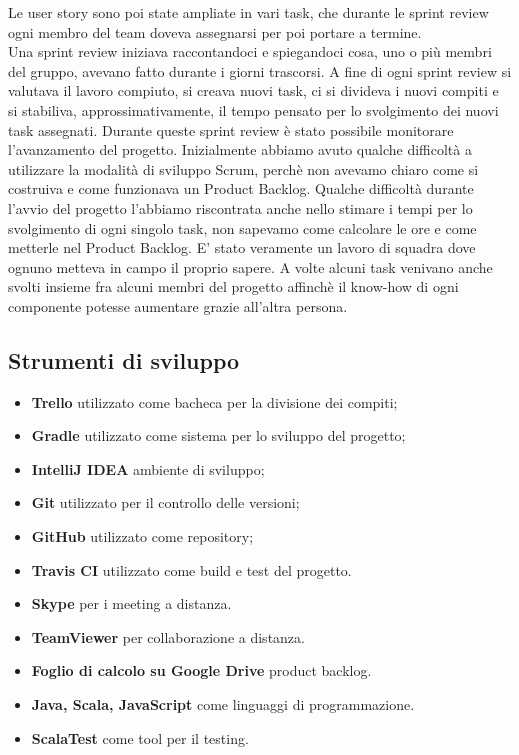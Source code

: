 \documentclass[12pt, italian]{article}
\begin{document}
Le user story sono poi state ampliate in vari task, che durante le sprint review ogni membro del team doveva assegnarsi per poi portare a termine. \\Una sprint review iniziava raccontandoci e spiegandoci cosa, uno o più membri del gruppo, avevano fatto durante i giorni trascorsi. A fine di ogni sprint review si valutava il lavoro compiuto, si creava nuovi task, ci si divideva i nuovi compiti e si stabiliva, approssimativamente, il tempo pensato per lo svolgimento dei nuovi task assegnati. Durante queste sprint review è stato possibile monitorare l'avanzamento del progetto. Inizialmente abbiamo avuto qualche difficoltà a utilizzare la modalità di sviluppo Scrum, perchè non avevamo chiaro come si costruiva e come funzionava un Product Backlog. Qualche difficoltà durante l'avvio del progetto l'abbiamo riscontrata anche nello stimare i tempi per lo svolgimento di ogni singolo task, non sapevamo come calcolare le ore e come metterle nel Product Backlog. E' stato veramente un lavoro di squadra dove ognuno metteva in campo il proprio sapere. A volte alcuni task venivano anche svolti insieme fra alcuni membri del progetto affinchè il know-how di ogni componente potesse aumentare grazie all'altra persona.

\subsection{Strumenti di sviluppo}
\begin{itemize}
	\item \textbf{Trello} utilizzato come bacheca per la divisione dei compiti;
	\item \textbf{Gradle} utilizzato come sistema per lo sviluppo del progetto;
	\item \textbf{IntelliJ IDEA} ambiente di sviluppo;
	\item \textbf{Git} utilizzato per il controllo delle versioni;
	\item \textbf{GitHub} utilizzato come repository;
	\item \textbf{Travis CI} utilizzato come build e test del progetto.
    \item \textbf{Skype} per i meeting a distanza.
    \item \textbf{TeamViewer} per collaborazione a distanza.
    \item \textbf{Foglio di calcolo su Google Drive} product backlog.
    \item \textbf{Java, Scala, JavaScript} come linguaggi di programmazione.
    \item \textbf{ScalaTest} come tool per il testing.
\end{itemize}
\end{document}
